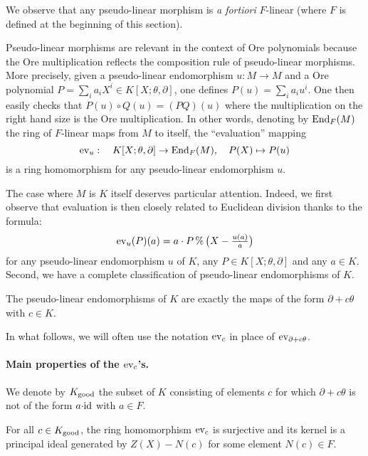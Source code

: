 \documentclass[a4paper]{llncs}
\newcommand{\id}{\textrm{\rm id}}
\newcommand{\End}{\textrm{\rm End}}
\newcommand{\ev}[1]{\textrm{\rm ev}_{#1}}
\renewcommand{\mod}{\,\%\,}
\newcommand{\good}{\textrm{\rm good}}
\begin{document}
We observe that any pseudo-linear morphism is \emph{a fortiori}
$F$-linear (where $F$ is defined at the beginning of this section).

Pseudo-linear morphisms are relevant in the context of Ore polynomials 
because the Ore multiplication reflects the composition rule of 
pseudo-linear morphisms. More precisely, given a pseudo-linear 
endomorphism $u : M \to M$ and a Ore polynomial $P = \sum_i a_i X^i \in 
K[X;\theta,\partial]$, one defines $P(u) = \sum_i a_i u^i$. One then 
easily checks that $P(u) \circ Q(u) = (PQ)(u)$ where the multiplication 
on the right hand size is the Ore multiplication. In other words, 
denoting by $\End_F(M)$ the ring of $F$-linear maps from $M$ to itself, 
the ``evaluation'' mapping
$$\ev{u} : \quad K[X;\theta,\partial] \to \End_F(M), \quad
P(X) \mapsto P(u)$$
is a ring homomorphism for any pseudo-linear endomorphism $u$.

The case where $M$ is $K$ itself deserves particular attention.
Indeed, we first observe that evaluation is then closely related to
Euclidean division thanks to the formula:
\begin{equation}
\label{eq:evanddiv}
\textstyle \ev{u}(P)(a) = 
a \cdot P \mod \big(X - \frac{u(a)}{a}\big)
\end{equation}
for any pseudo-linear endomorphism $u$ of $K$, any $P \in K[X;\theta,
\partial]$ and any $a \in K$. Second, we have a complete classification
of pseudo-linear endomorphisms of $K$.

\begin{proposition}
The pseudo-linear endomorphisms of $K$ are exactly the maps of
the form $\partial + c\theta$ with $c \in K$.
\end{proposition}

In what follows, we will often use the notation $\ev c$ in place of 
$\ev{\partial + c \theta}$.

\paragraph{Main properties of the $\ev c$'s.}

We denote by $K_\good$ the subset of $K$ consisting of elements $c$ for 
which $\partial + c\theta$ is not of the form $a{\cdot}\id$ with $a \in 
F$.

\begin{proposition}
\label{prop:evc}
For all $c \in K_\good$, the ring homomorphism $\ev{c}$ is surjective
and its kernel is a principal ideal generated by $Z(X) - N(c)$
for some element $N(c) \in F$.
\end{proposition}
\end{document}
